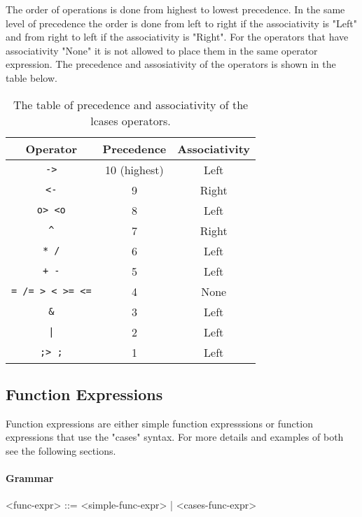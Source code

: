 \documentclass{article}
\begin{document}
The order of operations is done from highest to lowest precedence. In the same
level of precedence the order is done from left to right if the associativity
is "Left" and from right to left if the associativity is "Right". For the
operators that have associativity "None" it is not allowed to place them in the
same operator expression. The precedence and assosiativity of the operators
is shown in the table below.
\begin{table}[h!]

\caption{ The table of precedence and associativity of the lcases operators.  }

\begin{center}
\begin{tabular}{ |c|c|c| } 
\hline
Operator & Precedence & Associativity \\ 
\hline
\hline
\texttt{->} & 10 (highest) & Left \\
\hline
\texttt{<-} & 9 & Right \\
\hline
\texttt{o> <o} & 8 & Left \\
\hline
\texttt{\^} & 7 & Right \\
\hline
\texttt{* /} & 6 & Left \\
\hline
\texttt{+ -} & 5 & Left \\ 
\hline
\texttt{= /= > < >= <=} & 4 & None \\
\hline
\texttt{\&} & 3 & Left \\
\hline
\texttt{|} & 2 & Left \\
\hline
\texttt{;> ;} & 1 & Left \\
\hline
\end{tabular}
\end{center}

\label{table:precassoc}

\end{table}

\newpage
\subsection{Function Expressions}
\label{subsec:funcexprs}

Function expressions are either simple function expresssions or
function expressions that use the "cases" syntax. For more details and examples of
both see the following sections.

\paragraph{Grammar}
\begin{grammar}
<func-expr> ::= <simple-func-expr> | <cases-func-expr>
\end{grammar}
\end{document}
